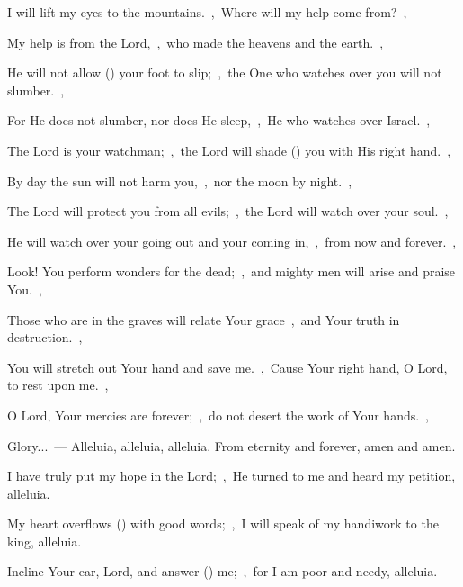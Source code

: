 \documentclass[12pt,twoside,a5paper]{article}
\begin{document}
\begin{halfparskip}
  I will lift my eyes to the mountains.~\sep\ Where will my help come from?~\sep

  My help is from the Lord,~\sep\ who made the heavens and the earth.~\sep

  He will not allow () your foot to slip;~\sep\ the One who watches over you will not slumber.~\sep

  For He does not slumber, nor does He sleep,~\sep\ He who watches over Israel.~\sep

  The Lord is your watchman;~\sep\ the Lord will shade () you with His right hand.~\sep

  By day the sun will not harm you,~\sep\ nor the moon by night.~\sep

  The Lord will protect you from all evils;~\sep\ the Lord will watch over your soul.~\sep

  He will watch over your going out and your coming in,~\sep\ from now and forever.~\sep
\end{halfparskip}

\begin{halfparskip}
   Look! You perform wonders for the dead;~\sep\ and mighty men will arise and praise You.~\sep

  Those who are in the graves will relate Your grace~\sep\ and Your truth in destruction.~\sep
\end{halfparskip}

\begin{halfparskip}
   You will stretch out Your hand and save me.~\sep\ Cause Your right hand, O Lord, to rest upon me.~\sep

  O Lord, Your mercies are forever;~\sep\ do not desert the work of Your hands.~\sep
\end{halfparskip}

Glory...~--- Alleluia, alleluia, alleluia. From eternity and forever, amen and amen.


 I have truly put my hope in the Lord;~\sep\ He turned to me and heard my petition, alleluia.

 My heart overflows () with good words;~\sep\ I will speak of my handiwork to the king, alleluia.

 Incline Your ear, Lord, and answer () me;~\sep\ for I am poor and needy, alleluia.
\end{document}
